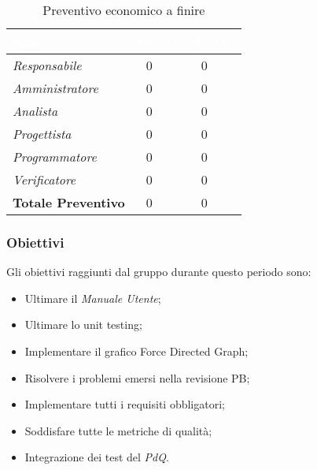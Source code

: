 \begin{table}[H]
    \renewcommand\arraystretch{1.5}
    \centering
    \begin{tabular}{|l|c|c|}
    \hline
    \rowcolor[HTML]{036400}
    \textcolor{white}{\textbf{Ruolo}} & \multicolumn{1}{l|}{\textcolor{white}{\textbf{Ore}}} & \multicolumn{1}{l|}{\textcolor{white}{\textbf{Costo (€)}}} \\ \hline
    \rowcolor[HTML]{EFEFEF}\textit{Responsabile}      & 0           & 0             \\ \hline
    \rowcolor[HTML]{C0C0C0}\textit{Amministratore}    & 0           & 0             \\ \hline
    \rowcolor[HTML]{EFEFEF}\textit{Analista}          & 0           & 0             \\ \hline
    \rowcolor[HTML]{C0C0C0}\textit{Progettista}       & 0           & 0             \\ \hline
    \rowcolor[HTML]{EFEFEF}\textit{Programmatore}     & 0           & 0             \\ \hline
    \rowcolor[HTML]{C0C0C0}\textit{Verificatore}      & 0           & 0             \\ \hline
    \rowcolor[HTML]{EFEFEF}\textbf{Totale Preventivo} & 0           & 0             \\ \hline
    \end{tabular}
    \caption{Preventivo economico a finire}
\end{table}

\subsubsection{Obiettivi}
Gli obiettivi raggiunti dal gruppo durante questo periodo sono:
\begin{itemize}
    \item Ultimare il \textit{Manuale Utente};
    \item Ultimare lo unit testing;
    \item Implementare il grafico Force Directed Graph;
    \item Risolvere i problemi emersi nella revisione PB;
    \item Implementare tutti i requisiti obbligatori;
    \item Soddisfare tutte le metriche di qualità;
    \item Integrazione dei test del \textit{PdQ}.
\end{itemize}

